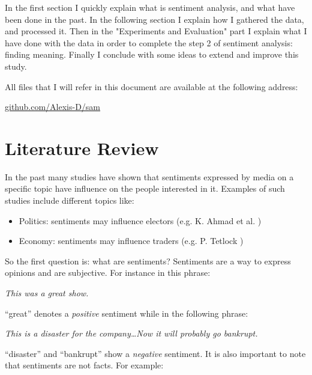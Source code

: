 \documentclass[12pt]{report}
\begin{document}
In the first section I quickly explain what is sentiment analysis, and what have been done in the past. In the following section I explain how I gathered the data, and processed it. Then in the "Experiments and Evaluation" part I explain what I have done with the data in order to complete the step 2 of sentiment analysis: finding meaning. Finally I conclude with some ideas to extend and improve this study.

All files that I will refer in this document are available at the following address:
\begin{center}
	\href{https://github.com/Alexis-D/sam}{github.com/Alexis-D/sam}
\end{center}

\chapter{Literature Review}

In the past many studies have shown that sentiments expressed by media on a specific topic have influence on the people interested in it. Examples of such studies include different topics like:

\begin{itemize}
	\item Politics: sentiments may influence electors (e.g. K. Ahmad et al. \cite{ahmad11})
	\item Economy: sentiments may influence traders (e.g. P. Tetlock \cite{tetlock07})
\end{itemize}

So the first question is: what are sentiments? Sentiments are a way to express opinions and are subjective. For instance in this phrase:

\begin{center}
	\emph{This was a {\color{green}great} show.}
\end{center}

``{\color{green}great}'' denotes a \emph{positive} sentiment while in the following phrase:

\begin{center}
	\emph{This is a {\color{red}disaster} for the company\ldots Now it will probably go {\color{red}bankrupt}.}
\end{center}

``{\color{red}disaster}'' and ``{\color{red}bankrupt}'' show a \emph{negative} sentiment. It is also important to note that sentiments are not facts\cite{wright09}. For example:
\end{document}

